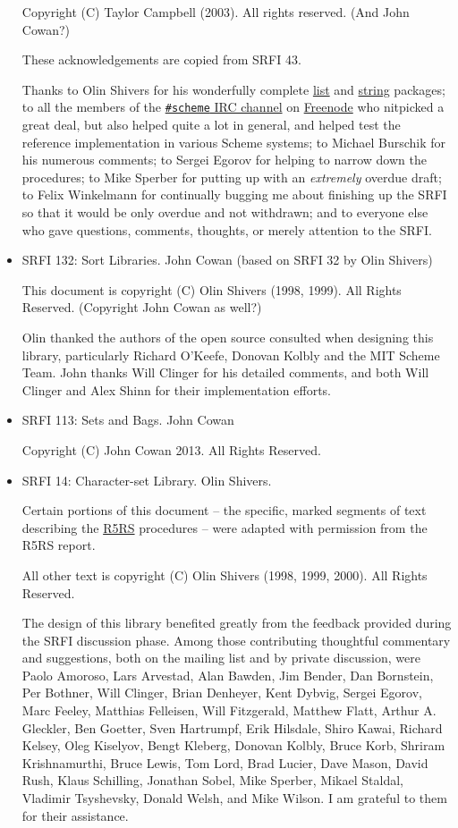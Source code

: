 \begin{itemize}
Copyright (C) Taylor Campbell (2003). All rights reserved.
(And John Cowan?)

These acknowledgements are copied from SRFI 43.

Thanks to Olin Shivers for his wonderfully complete
\protect\hyperlink{SRFI-1}{list} and \protect\hyperlink{SRFI-13}{string}
packages; to all the members of the
\href{http://scheme-irc.webhop.org/}{\texttt{\#scheme} IRC channel} on
\href{http://www.freenode.net/}{Freenode} who nitpicked a great deal,
but also helped quite a lot in general, and helped test the reference
implementation in various Scheme systems; to Michael Burschik for his
numerous comments; to Sergei Egorov for helping to narrow down the
procedures; to Mike Sperber for putting up with an \emph{extremely}
overdue draft; to Felix Winkelmann for continually bugging me about
finishing up the SRFI so that it would be only overdue and not
withdrawn; and to everyone else who gave questions, comments, thoughts,
or merely attention to the SRFI.

\item SRFI 132: Sort Libraries. John Cowan (based on SRFI 32 by Olin Shivers)

This document is copyright (C) Olin Shivers (1998, 1999). All Rights
Reserved. (Copyright John Cowan as well?)

Olin thanked the authors of the open source consulted when designing
this library, particularly Richard O'Keefe, Donovan Kolbly and the MIT
Scheme Team. John thanks Will Clinger for his detailed comments, and
both Will Clinger and Alex Shinn for their implementation efforts.

\item SRFI 113: Sets and Bags. John Cowan

Copyright (C) John Cowan 2013. All Rights Reserved.

\item SRFI 14: Character-set Library. Olin Shivers.

Certain portions of this document -- the specific, marked segments of
text describing the \protect\hyperlink{R5RS}{R5RS} procedures -- were
adapted with permission from the R5RS report.

All other text is copyright (C) Olin Shivers (1998, 1999, 2000). All
Rights Reserved.


The design of this library benefited greatly from the feedback provided
during the SRFI discussion phase. Among those contributing thoughtful
commentary and suggestions, both on the mailing list and by private
discussion, were Paolo Amoroso, Lars Arvestad, Alan Bawden, Jim Bender,
Dan Bornstein, Per Bothner, Will Clinger, Brian Denheyer, Kent Dybvig,
Sergei Egorov, Marc Feeley, Matthias Felleisen, Will Fitzgerald, Matthew
Flatt, Arthur A. Gleckler, Ben Goetter, Sven Hartrumpf, Erik Hilsdale,
Shiro Kawai, Richard Kelsey, Oleg Kiselyov, Bengt Kleberg, Donovan
Kolbly, Bruce Korb, Shriram Krishnamurthi, Bruce Lewis, Tom Lord, Brad
Lucier, Dave Mason, David Rush, Klaus Schilling, Jonathan Sobel, Mike
Sperber, Mikael Staldal, Vladimir Tsyshevsky, Donald Welsh, and Mike
Wilson. I am grateful to them for their assistance.


\end{itemize}
